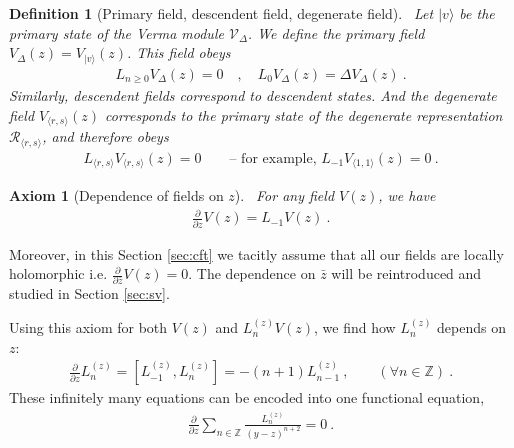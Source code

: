 \documentclass[12pt, a4paper]{article}
\theoremstyle{break}
\newtheorem{hyp}[exo]{Axiom}
\newtheorem{defn}[exo]{Definition}
\begin{document}
\begin{defn}[Primary field, descendent field, degenerate field]
~\label{def:pfdf}
Let $|v\rangle$ be the primary state of the Verma module $\mathcal V_\Delta$.
We define the primary field $V_\Delta(z)=V_{|v\rangle}(z)$. This field obeys
\begin{align}
 L_{n\geq 0} V_\Delta(z) = 0 \quad , \quad L_0 V_\Delta(z) = \Delta V_\Delta(z)\ .
\end{align}
Similarly, descendent fields correspond to descendent states. And the degenerate field $V_{\langle r,s\rangle}(z)$ corresponds to the primary state of the degenerate representation $\mathcal{R}_{\langle r,s\rangle}$, and therefore obeys 
\begin{align}
 L_{\langle r, s\rangle} V_{\langle r,s\rangle}(z) = 0\qquad \text{-- for example, \ } L_{-1}V_{\langle 1,1\rangle}(z) = 0\ .
\end{align}
\end{defn}

\begin{hyp}[Dependence of fields on $z$]
 ~\label{hyp:geom}
 For any field $V(z)$, we have 
 \begin{align}
  \frac{\partial}{\partial z} V(z) = L_{-1} V(z)  \ .
  \label{pvlv}
 \end{align}
\end{hyp}
Moreover, in this Section \ref{sec:cft} we tacitly assume that all our fields are locally holomorphic i.e. $\frac{\partial}{\partial \bar z} V(z) = 0$. The dependence on $\bar z$ will be reintroduced and studied in Section \ref{sec:sv}.

Using this axiom for both $V(z)$ and $L_n^{(z)}V(z)$, we find how $L_n^{(z)}$ depends on $z$:
\begin{align}
 \frac{\partial}{\partial z} L_n^{(z)} = [L_{-1}^{(z)},L_n^{(z)}]= -(n+1)L_{n-1}^{(z)}\ ,\qquad (\forall n\in\mathbb{Z})\ .
\end{align}
These infinitely many equations can be encoded into one functional equation,
\begin{align}
 \frac{\partial}{\partial z} \sum_{n\in\mathbb{Z}} \frac{L_n^{(z)}}{(y-z)^{n+2}} = 0\ .
\end{align}
\end{document}

